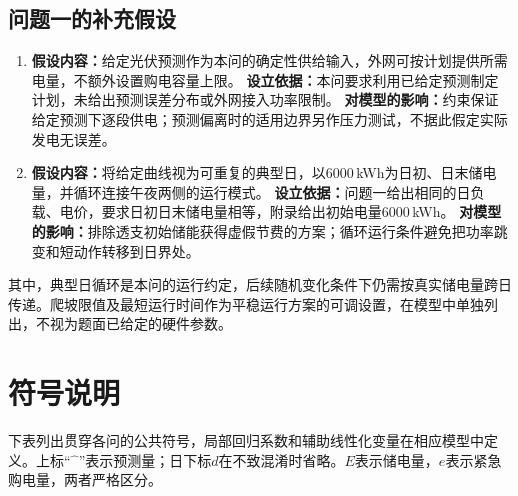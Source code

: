 \documentclass[withoutpreface,bwprint]{cumcmthesis}
\begin{document}
\subsection*{问题一的补充假设}
\begin{enumerate}[label=\textbf{补充假设\arabic*：},leftmargin=6.5em,itemsep=5pt]
 \item \textbf{假设内容：}给定光伏预测作为本问的确定性供给输入，外网可按计划提供所需电量，不额外设置购电容量上限。
 \textbf{设立依据：}本问要求利用已给定预测制定计划，未给出预测误差分布或外网接入功率限制。
 \textbf{对模型的影响：}约束保证给定预测下逐段供电；预测偏离时的适用边界另作压力测试，不据此假定实际发电无误差。

 \item \textbf{假设内容：}将给定曲线视为可重复的典型日，以6000\,kWh为日初、日末储电量，并循环连接午夜两侧的运行模式。
 \textbf{设立依据：}问题一给出相同的日负载、电价，要求日初日末储电量相等，附录给出初始电量6000\,kWh。
 \textbf{对模型的影响：}排除透支初始储能获得虚假节费的方案；循环运行条件避免把功率跳变和短动作转移到日界处。
\end{enumerate}
其中，典型日循环是本问的运行约定，后续随机变化条件下仍需按真实储电量跨日传递。爬坡限值及最短运行时间作为平稳运行方案的可调设置，在模型中单独列出，不视为题面已给定的硬件参数。

\clearpage
\section{符号说明}
下表列出贯穿各问的公共符号，局部回归系数和辅助线性化变量在相应模型中定义。上标“$\widehat{\phantom{x}}$”表示预测量；日下标$d$在不致混淆时省略。$E$表示储电量，$e$表示紧急购电量，两者严格区分。
\end{document}
